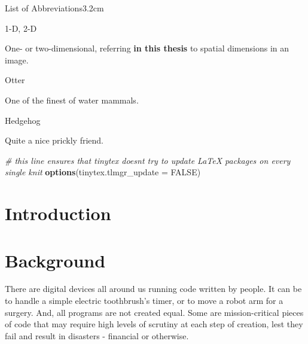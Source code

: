\documentclass[a4paper, nobind]{templates/ociamthesis}
\newenvironment{Shaded}{\begin{snugshade}}{\end{snugshade}}
\newcommand{\AttributeTok}[1]{\textcolor[rgb]{0.13,0.29,0.53}{#1}}
\newcommand{\CommentTok}[1]{\textcolor[rgb]{0.56,0.35,0.01}{\textit{#1}}}
\newcommand{\ConstantTok}[1]{\textcolor[rgb]{0.56,0.35,0.01}{#1}}
\newcommand{\FunctionTok}[1]{\textcolor[rgb]{0.13,0.29,0.53}{\textbf{#1}}}
\newcommand{\NormalTok}[1]{#1}
\renewenvironment{Shaded}
{
  \vspace{10pt}%
  \begin{snugshade}%
}{%
  \end{snugshade}%
  \vspace{8pt}%
}
\begin{document}
\begin{romanpages}
\begin{mclistof}{List of Abbreviations}{3.2cm}
\item[1-D, 2-D]

One- or two-dimensional, referring \textbf{in this thesis} to spatial dimensions in an image.

\item[Otter]

One of the finest of water mammals.

\item[Hedgehog]

Quite a nice prickly friend.

\end{mclistof} 


\end{romanpages}

\flushbottom

\begin{Shaded}
\begin{Highlighting}[]
\CommentTok{\# this line ensures that tinytex doesn\textquotesingle{}t try to update LaTeX packages on every single knit}
\FunctionTok{options}\NormalTok{(}\AttributeTok{tinytex.tlmgr\_update =} \ConstantTok{FALSE}\NormalTok{)}
\end{Highlighting}
\end{Shaded}

\chapter*{Introduction}\label{introduction}

\adjustmtc
{}

\chapter{Background}\label{background}

\minitoc 

There are digital devices all around us running code written by people. It can be
to handle a simple electric toothbrush's timer, or to move a robot arm for a surgery.
And, all programs are not created equal. Some are mission-critical pieces of code that
may require high levels of scrutiny at each step of creation, lest they fail and
result in disasters - financial or otherwise.
\end{document}
